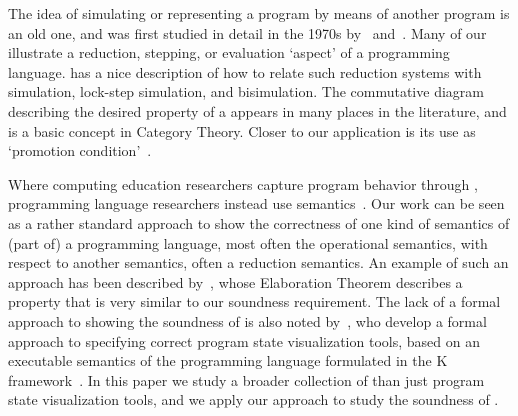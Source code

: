 The idea of simulating or representing a program by means of another program is an old one, 
and was first studied in detail in the 1970s by~\citet{milnerAlgebraicDefinitionSimulation1971} and~\citet{hoareProofCorrectnessData1972}. 
Many of our \nms{} illustrate a reduction, stepping, or evaluation `aspect' of a programming language. 
\citet{wadlerProgrammingLanguageFoundations2020} has a nice description of how to relate such reduction systems with simulation, lock-step simulation, and bisimulation.
The commutative diagram describing the desired property of a \nm{} appears in many places in the literature, and is a basic concept in Category Theory. Closer to our application is its use as `promotion condition'~\cite{birdPromotionAccumulationStrategies1984,wangRefactoringPatternMatching2013}.

Where computing education researchers capture program behavior through \nms{}, programming language researchers instead use semantics~\cite{krishnamurthiProgrammingParadigms2019}. Our work can be seen as a rather standard approach to show the correctness of one kind of semantics of (part of) a programming language, most often the operational semantics, with respect to another semantics, often a reduction semantics. An example of such an approach has been described by~\citet{clementsModelingAlgebraicStepper2001}, whose Elaboration Theorem describes a property that is very similar to our soundness requirement.
%
The lack of a formal approach to showing the soundness of \nms{} is also noted by~\citet{pollockTheiaAutomaticallyGenerating2019}, who develop a formal approach to specifying correct program state visualization tools, based on an executable semantics of the programming language formulated in the K framework~\citep{rosuOverviewSemanticFramework2010}.
In this paper we study a broader collection of \nms{} than just program state visualization tools, and we apply our approach to study the soundness of \nms{}.



